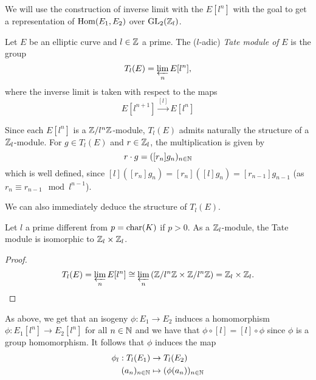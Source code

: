 We will use the construction of inverse limit with the $E[l^n]$
with the goal to get a representation of $\operatorname{Hom}(E_1, E_2)$ over
$\operatorname{GL}_2(\mathbb{Z}_l)$.


\begin{definition}
	Let $E$ be an elliptic curve and $l \in \mathbb{Z}$ a prime.
	The ($l$-adic) \emph{Tate module of} $E$ is the group
	\begin{equation*}
		T_l(E) = \varprojlim_n E[l^n],
	\end{equation*}
	where the inverse limit is taken with respect to the maps
	\begin{equation*}
		E[l^{n+1}]\xrightarrow{[l]} E[l^n]
	\end{equation*}
\end{definition}

Since each $E[l^n]$ is a $\mathbb{Z}/l^n\mathbb{Z}$-module, $T_l(E)$ admits naturally the
structure of a $\mathbb{Z}_l$-module. For $g \in T_l(E)$ and $r \in \mathbb{Z}_l$, the 
multiplication is given by
\begin{equation*}
	r \cdot g = ([r_n]g_n)_{n \in \mathbb{N}}
\end{equation*}
which is well defined, since $[l]([r_n]g_n) = [r_n]([l]g_n) = [r_{n-1}]g_{n-1}$
(as $r_n \equiv r_{n-1} \mod l^{n-1}$).

We can also immediately deduce the structure of $T_l(E)$.


\begin{proposition}
	Let $l$ a prime different from $p = \operatorname{char}(K)$ if $p > 0$.
	As a $\mathbb{Z}_l$-module, the Tate module is isomorphic to $\mathbb{Z}_l \times \mathbb{Z}_l$.
\end{proposition}
\begin{proof}
	\begin{equation*}
		T_l(E) = \varprojlim_n E[l^n]
		\cong \varprojlim_n\left( \mathbb{Z}/l^n\mathbb{Z}\times\mathbb{Z}/l^n\mathbb{Z}\right)
		= \mathbb{Z}_l \times \mathbb{Z}_l.
	\end{equation*}
\end{proof}

As above, we get that an isogeny $\phi: E_1 \to E_2$ induces a homomorphism
$\phi: E_1[l^n] \to E_2[l^n]$ for all $n \in \mathbb{N}$ and we have that
$\phi\circ[l] = [l]\circ\phi$ since $\phi$ is a group homomorphism.
It follows that $\phi$ induces the map
\begin{align*}
	\phi_l: T_l(E_1) &\to T_l(E_2)\\
	(a_n)_{n \in \mathbb{N}} &\mapsto (\phi(a_n))_{n \in \mathbb{N}}
\end{align*}

